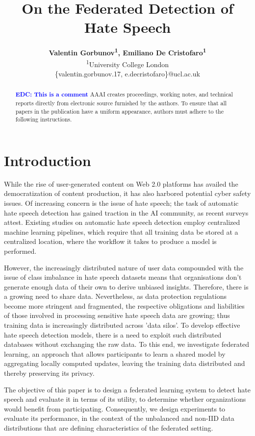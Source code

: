 \documentclass[letterpaper]{article} %
\title{On the Federated Detection of Hate Speech}
\author{\Large \textbf{Valentin Gorbunov\textsuperscript{\rm 1}, Emiliano De Cristofaro\textsuperscript{\rm 1}}\\
\textsuperscript{\rm 1}University College London\\
\{valentin.gorbunov.17, e.decristofaro\}@ucl.ac.uk}
\begin{document}
\maketitle

\begin{abstract}
\textcolor{blue}{\textbf{EDC: This is a comment}}
AAAI creates proceedings, working notes, and technical reports directly from electronic source furnished by the authors. To ensure that all papers in the publication have a uniform appearance, authors must adhere to the following instructions. 
\end{abstract}

\section{Introduction}
While the rise of user-generated content on Web 2.0 platforms has availed the democratization of content production, it has also harbored potential cyber safety issues. Of increasing concern is the issue of hate speech; the task of automatic hate speech detection has gained traction in the AI community, as recent surveys attest. Existing studies on automatic hate speech detection employ centralized machine learning pipelines, which require that all training data be stored at a centralized location, where the workflow it takes to produce a model is performed. \par
However, the increasingly distributed nature of user data compounded with the issue of class imbalance in hate speech datasets means that organisations don't generate enough data of their own to derive unbiased insights. Therefore, there is a growing need to share data. Nevertheless, as data protection regulations become more stringent and fragmented, the respective obligations and liabilities of those involved in processing sensitive hate speech data are growing; thus training data is increasingly distributed across 'data silos'. To develop effective hate speech detection models, there is a need to exploit such distributed databases without exchanging the raw data. To this end, we investigate federated learning, an approach that allows participants to learn a shared model by aggregating locally computed updates, leaving the training data distributed and thereby preserving its privacy.\par
The objective of this paper is to design a federated learning system to detect hate speech and evaluate it in terms of its utility, to determine whether organizations would benefit from participating. Consequently, we design experiments to evaluate its performance, in the context of the unbalanced and non-IID data distributions that are defining characteristics of the federated setting.
\end{document}
